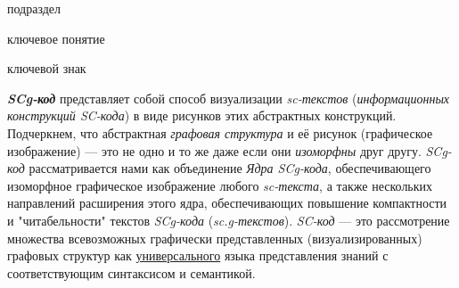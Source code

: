 \begin{SCn}
\begin{scnrelfromlist}{подраздел}
\end{scnrelfromlist}

\begin{scnrelfromlist}{ключевое понятие}
\end{scnrelfromlist}

\begin{scnrelfromlist}{ключевой знак}
\end{scnrelfromlist}
\end{SCn}

\begin{SCn}
\end{SCn}

\textbf{\textit{SCg-код}} представляет собой способ визуализации \textit{sc-текстов} (\textit{информационных конструкций SC-кода}) в виде рисунков этих абстрактных конструкций. Подчеркнем, что абстрактная \textit{графовая структура} и её рисунок (графическое изображение) --- это не одно и то же даже если они \textit{изоморфны} друг другу. \mbox{\textit{SCg-код}} рассматривается нами как объединение \textit{Ядра SCg-кода}, обеспечивающего изоморфное графическое изображение любого \textit{sc-текста}, а также нескольких направлений расширения этого ядра, обеспечивающих повышение компактности и "читабельности"{} текстов \textit{SCg-кода} (\textit{sc.g-текстов}).
\textit{SC-код} --- это рассмотрение множества всевозможных графически представленных (визуализированных) графовых структур как \underline{универсального} языка представления знаний с соответствующим синтаксисом и семантикой.

